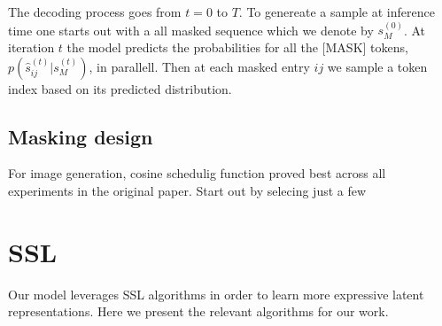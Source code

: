 \documentclass[../../thesis.tex]{subfiles}
\begin{document}
The decoding process goes from $t = 0$ to $T$. To genereate a sample at inference time one starts out with a all masked sequence which we denote by $s_M^{(0)}$. At iteration $t$ the model predicts the probabilities for all the [MASK] tokens, $p(\hat{s}_{ij}^{(t)}|s_M^{(t)})$, in parallell. Then at each masked entry $ij$ we sample a token index based on its predicted distribution.  

\subsection{Masking design}

For image generation, cosine schedulig function proved best across all experiments in the original paper. Start out by selecing just a few 




\section{SSL}

Our model leverages SSL algorithms in order to learn more expressive latent representations. Here we present the relevant algorithms for our work. 


\end{document}
